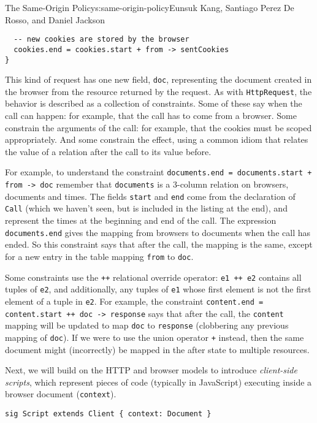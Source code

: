 \begin{aosachapter}{The Same-Origin Policy}{s:same-origin-policy}{Eunsuk Kang, Santiago Perez De Rosso, and Daniel Jackson}
\begin{verbatim}
  -- new cookies are stored by the browser
  cookies.end = cookies.start + from -> sentCookies
}
\end{verbatim}

This kind of request has one new field, \texttt{doc}, representing the
document created in the browser from the resource returned by the
request. As with \texttt{HttpRequest}, the behavior is described as a
collection of constraints. Some of these say when the call can happen:
for example, that the call has to come from a browser. Some constrain
the arguments of the call: for example, that the cookies must be scoped
appropriately. And some constrain the effect, using a common idiom that
relates the value of a relation after the call to its value before.

For example, to understand the constraint
\texttt{documents.end = documents.start + from -\textgreater{} doc}
remember that \texttt{documents} is a 3-column relation on browsers,
documents and times. The fields \texttt{start} and \texttt{end} come
from the declaration of \texttt{Call} (which we haven't seen, but is
included in the listing at the end), and represent the times at the
beginning and end of the call. The expression \texttt{documents.end}
gives the mapping from browsers to documents when the call has ended. So
this constraint says that after the call, the mapping is the same,
except for a new entry in the table mapping \texttt{from} to
\texttt{doc}.

Some constraints use the \texttt{++} relational override operator:
\texttt{e1 ++ e2} contains all tuples of \texttt{e2}, and additionally,
any tuples of \texttt{e1} whose first element is not the first element
of a tuple in \texttt{e2}. For example, the constraint
\texttt{content.end = content.start ++ doc -\textgreater{} response}
says that after the call, the \texttt{content} mapping will be updated
to map \texttt{doc} to \texttt{response} (clobbering any previous
mapping of \texttt{doc}). If we were to use the union operator
\texttt{+} instead, then the same document might (incorrectly) be mapped
in the after state to multiple resources.

\label{script}

Next, we will build on the HTTP and browser models to introduce
\emph{client-side scripts}, which represent pieces of code (typically in
JavaScript) executing inside a browser document (\texttt{context}).

\begin{verbatim}
sig Script extends Client { context: Document }
\end{verbatim}


\end{aosachapter}
